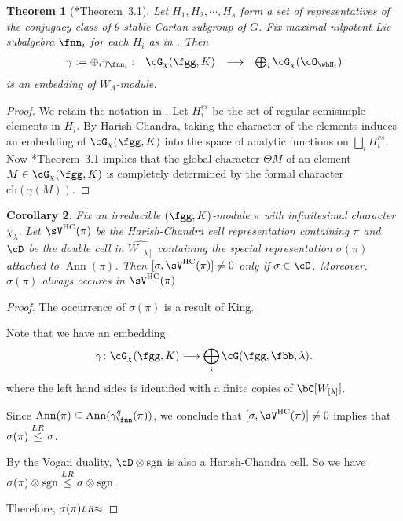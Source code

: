 \documentclass[12pt,a4paper]{amsart}
\DeclareMathOperator{\Ann}{Ann}
\newcommand{\sgn}{\operatorname{sgn}}
\numberwithin{equation}{section}
\newtheorem{thm}{Theorem}[section]
\newtheorem{cor}[thm]{Corollary}
\theoremstyle{remark}
\def\WLam{W_{\Lambda}}
\begin{document}
\begin{thm}[\cite{Cas}*{Theorem~3.1}]
  Let $H_{1}, H_{2}, \cdots, H_{s}$ form a set of representatives of the
  conjugacy class of $\theta$-stable Cartan subgroup of $G$. Fix maximal
  nilpotent Lie subalgebra $\fnn_{i}$ for each $H_{i}$ as in .
  Then
  \[
    \begin{array}{cccc}
      \gamma:=\oplus_{i} \gamma_{\fnn_{i}}: &\Grt_{\chi}(\fgg,K)
      &\longrightarrow & \bigoplus_{i} \Grt_{\chi}(\cO_{\whH_{i}})\\
    \end{array}
  \]
  is an embedding of $\WLam$-module.
\end{thm}
\begin{proof}
  We retain the notation in \cite{Cas}.
  Let $H^{rs}_{i}$ be the set of regular semisimple elements in $H_{i}$. By
  Harish-Chandra, taking the character of the elements induces an embedding of
  $\Grt_{\chi}(\fgg,K)$ into the space of analytic functions on
  $\bigsqcup_{i} H^{rs}_{i}$. Now \cite{Cas}*{Theorem~3.1} implies that the
  global character $\Theta M$ of an element $M\in \Grt_{\chi}(\fgg,K)$ is
  completely determined by the formal character $\mathrm{ch}(\gamma(M))$.
\end{proof}

\def\VHC{\sV^{\mathrm{HC}}}
\begin{cor}
  Fix an irreducible $(\fgg,K)$-module $\pi$ with infinitesimal character
  $\chi_{\lambda}$. Let $\VHC(\pi)$ be the Harish-Chandra cell representation
  containing $\pi$ and $\cD$ be the double cell in $\widehat{W_{[\lambda]}}$
  containing the special representation $\sigma(\pi)$attached to $\Ann(\pi)$.
  Then $[\sigma, \VHC(\pi)]\neq 0$ only if $\sigma \in \cD$.
  Moreover, $\sigma(\pi)$ always occures in $\VHC(\pi)$
\end{cor}
\begin{proof}
  The occurrence of $\sigma(\pi)$ is a result of King.

  Note that we have an embedding
  \[
    \gamma \colon \Grt_{\chi}(\fgg,K)\longrightarrow \bigoplus_{i}\Grt(\fgg,\fbb,\lambda).
  \]
  where the left hand sides is identified with a finite copies of
  $\bC[W_{[\lambda]}]$.

  Since $\Ann(\pi)\subseteq \Ann (\gamma_{\fnn}^{q}(\pi))$,
  we conclude that $[\sigma, \VHC(\pi)]\neq 0$ implies that
  $\sigma(\pi)\stackrel{LR}{\leq} \sigma$.

  By the Vogan duality, $\cD\otimes \sgn$ is also a Harish-Chandra cell.
  So we have $\sigma(\pi)\otimes \sgn \leqLR \sigma\otimes \sgn$.

  Therefore, $\sigma(\pi)\substack{LR}{\approx}$
\end{proof}
\end{document}
